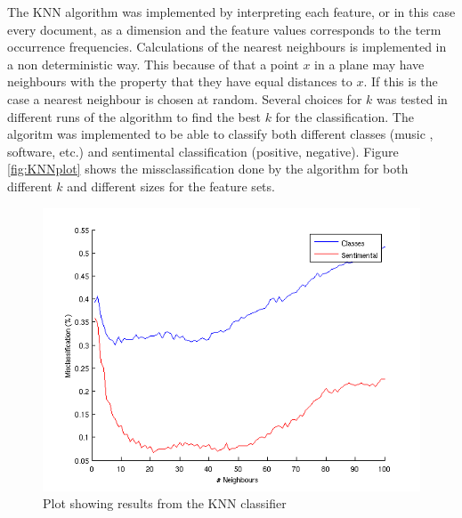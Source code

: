 The KNN algorithm was implemented by interpreting each feature, or in this case
every document, as a dimension and the feature values corresponds to the term
occurrence frequencies. Calculations of the nearest neighbours is
implemented in a non deterministic way. This because of that a point $x$ in a plane
may have neighbours with the property that they have equal distances to
$x$. If this is the case a nearest neighbour is chosen at random. Several choices
for $k$ was tested in different runs of the algorithm to find the best $k$ for
the classification. The algoritm was implemented to be able to classify both
different classes (music , software, etc.) and sentimental classification
(positive, negative). Figure \ref{fig:KNNplot} shows the missclassification done by the
algorithm for both different $k$ and different sizes for the feature sets.
\begin{figure}[h!]
\begin{center}
\caption{Plot showing results from the KNN classifier}
\includegraphics[scale=0.6]{fig/knn_2000words_testdata100_unigram}
\end{center}
\end{figure}
\label{fig:KNNplot}

%
